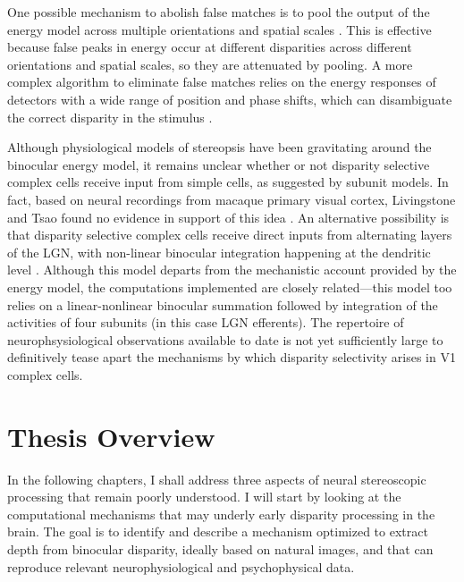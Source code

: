 One possible mechanism to abolish false matches is to pool the output of the energy model across multiple orientations and spatial scales \cite{Fleet:1996tq}. This is effective because false peaks in energy occur at different disparities across different orientations and spatial scales, so they are attenuated by pooling. A more complex algorithm to eliminate false matches relies on the energy responses of detectors with a wide range of position and phase shifts, which can disambiguate the correct disparity in the stimulus \cite{Read:2007nx}.

Although physiological models of stereopsis have been gravitating around the binocular energy model, it remains unclear whether or not disparity selective complex cells receive input from simple cells, as suggested by subunit models. In fact, based on neural recordings from macaque primary visual cortex, Livingstone and Tsao found no evidence in support of this idea \cite{Livingstone:1999mp}. An alternative possibility is that disparity selective complex cells receive direct inputs from alternating layers of the LGN, with non-linear binocular integration happening at the dendritic level \cite{Archie:2000fk}. Although this model departs from the mechanistic account provided by the energy model, the computations implemented are closely related---this model too relies on a linear-nonlinear binocular summation followed by integration of the activities of four subunits (in this case LGN efferents). The repertoire of neurophsysiological observations available to date is not yet sufficiently large to definitively tease apart the mechanisms by which disparity selectivity arises in V1 complex cells.



\section{Thesis Overview} 

In the following chapters, I shall address three aspects of neural stereoscopic processing that remain poorly understood. I will start by looking at the computational mechanisms that may underly early disparity processing in the brain. The goal is to identify and describe a mechanism optimized to extract depth from binocular disparity, ideally based on natural images, and that can reproduce relevant neurophysiological and psychophysical data.


